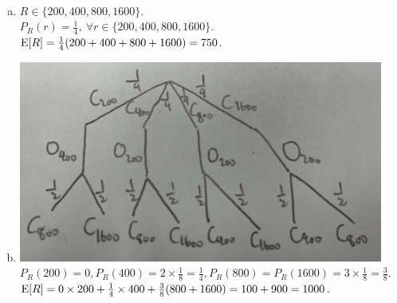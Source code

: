 \begin{pr}$ $
\begin{enumerate}[(a)]
\item $R\in\{200, 400, 800, 1600\}$.\\
$P_R(r)=\frac14,\ \forall r\in\{200, 400, 800, 1600\}$.\\
$\mathrm{E}[R]=\frac14(200+400+800+1600)=750$.
\item \includegraphics[width=12cm]{9.JPG}\\
$P_R(200)=0, P_R(400)=2\times\frac18=\frac14, P_R(800)=P_R(1600)=3\times\frac18=\frac38$.\\
$\mathrm{E}[R]=0\times200+\frac14\times400+\frac38(800+1600)=100+900=1000$.
\end{enumerate}
\end{pr}
